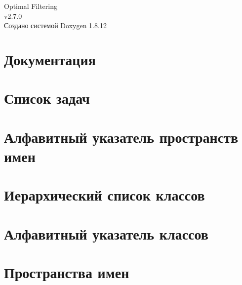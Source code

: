 \documentclass[twoside]{book}
\newcommand{\+}{\discretionary{\mbox{\scriptsize$\hookleftarrow$}}{}{}}
\newcommand{\clearemptydoublepage}{%
  \newpage{\pagestyle{empty}\cleardoublepage}%
}
\begin{document}
\hypersetup{pageanchor=false,
             bookmarksnumbered=true,
             pdfencoding=unicode
            }
\begin{titlepage}
\vspace*{7cm}
\begin{center}%
{\Large Optimal Filtering \\[1ex]\large v2.\+7.\+0 }\\
\vspace*{1cm}
{\large Создано системой Doxygen 1.8.12}\\
\end{center}
\end{titlepage}
\clearemptydoublepage
{}
\tableofcontents
\clearemptydoublepage
{}
\hypersetup{pageanchor=true}

\chapter{Документация}
\label{index}\hypertarget{index}{}
\chapter{Список задач}
\label{todo}
\hypertarget{todo}{}

\chapter{Алфавитный указатель пространств имен}

\chapter{Иерархический список классов}

\chapter{Алфавитный указатель классов}

\chapter{Пространства имен}














\end{document}
